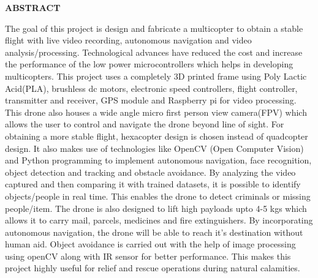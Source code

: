 \documentclass[12pt,a4paper]{report}
\begin{document}
\newpage
\begin{verbatim}
\end{verbatim}
\begin{center}
{\bf{ABSTRACT}}
\end{center}
\vspace{30pt}
\begin{doublespace}
\hspace*{1cm}  The goal of this project is design and fabricate a multicopter  to obtain a stable flight with live video recording,  autonomous navigation and video analysis/processing. Technological advances have reduced the cost
and increase the performance of the low power microcontrollers which helps in developing multicopters.  This project uses a completely 3D printed frame using Poly Lactic Acid(PLA), brushless dc motors, electronic speed controllers, flight controller, transmitter and receiver, GPS module and Raspberry pi for video processing. This drone also houses a  wide angle micro first person view camera(FPV) which allows the user to control and navigate the drone beyond line of sight. For obtaining a more stable flight, hexacopter design is chosen instead of quadcopter design. It also makes use of technologies like OpenCV
(Open Computer Vision) and Python programming to implement autonomous navigation, face recognition, object detection and tracking and  obstacle avoidance. By analyzing the video captured and then comparing it with trained datasets, it is possible to identify objects/people in real time.  This enables the drone to detect criminals or missing people/item. The drone is also designed to lift high payloads upto 4-5 kgs which allows it to carry mail, parcels, medicines and fire extinguishers. By incorporating autonomous navigation, the drone will be able to reach it's destination without human aid. Object avoidance is carried out with the help of image processing using openCV along with IR sensor for better performance.  This makes this project highly useful for relief and rescue operations during natural calamities. 

\end{doublespace}


\newpage
{
%
}
\tableofcontents
{}
\listoffigures
{}
\end{document}
